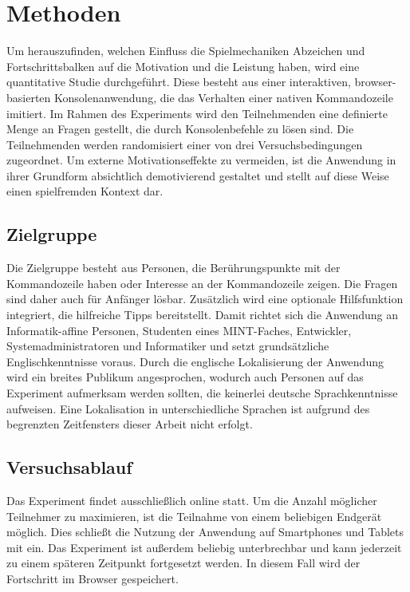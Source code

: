 \section{Methoden}

Um herauszufinden, welchen Einfluss die Spielmechaniken Abzeichen und Fortschrittsbalken auf die Motivation und die Leistung haben, wird eine quantitative Studie durchgeführt. Diese besteht aus einer interaktiven, browser-basierten Konsolenanwendung, die das Verhalten einer nativen Kommandozeile imitiert. Im Rahmen des Experiments wird den Teilnehmenden eine definierte Menge an Fragen gestellt, die durch Konsolenbefehle zu lösen sind. Die Teilnehmenden werden randomisiert einer von drei Versuchsbedingungen zugeordnet. Um externe Motivationseffekte zu vermeiden, ist die Anwendung in ihrer Grundform absichtlich demotivierend gestaltet und stellt auf diese Weise einen spielfremden Kontext dar.

\subsection{Zielgruppe}
Die Zielgruppe besteht aus Personen, die Berührungspunkte mit der Kommandozeile haben oder Interesse an der Kommandozeile zeigen. Die Fragen sind daher auch für Anfänger lösbar. Zusätzlich wird eine optionale Hilfsfunktion integriert, die hilfreiche Tipps bereitstellt. Damit richtet sich die Anwendung an Informatik-affine Personen, Studenten eines MINT-Faches, Entwickler, Systemadministratoren und Informatiker und setzt grundsätzliche Englischkenntnisse voraus. Durch die englische Lokalisierung der Anwendung wird ein breites Publikum angesprochen, wodurch auch Personen auf das Experiment aufmerksam werden sollten, die keinerlei deutsche Sprachkenntnisse aufweisen. Eine Lokalisation in unterschiedliche Sprachen ist aufgrund des begrenzten Zeitfensters dieser Arbeit nicht erfolgt.

\subsection{Versuchsablauf}
Das Experiment findet ausschließlich online statt. Um die Anzahl möglicher Teilnehmer zu maximieren, ist die Teilnahme von einem beliebigen Endgerät möglich. Dies schließt die Nutzung der Anwendung auf Smartphones und Tablets mit ein. Das Experiment ist außerdem beliebig unterbrechbar und kann jederzeit zu einem späteren Zeitpunkt fortgesetzt werden. In diesem Fall wird der Fortschritt im Browser gespeichert.

